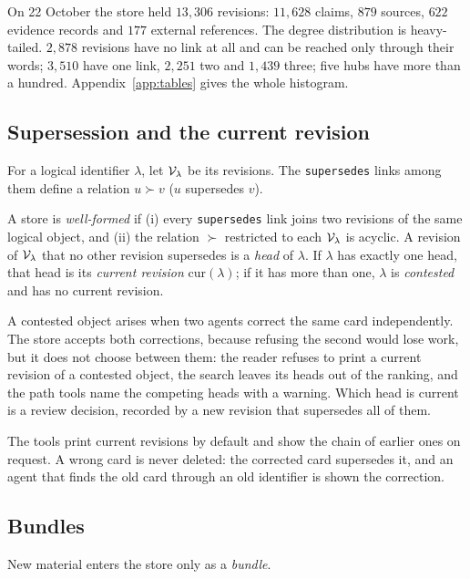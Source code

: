 On 22 October the store held $13{,}306$ revisions: $11{,}628$ claims, $879$ sources, $622$ evidence records and $177$ external references. The degree distribution is heavy-tailed. $2{,}878$ revisions have no link at all and can be reached only through their words; $3{,}510$ have one link, $2{,}251$ two and $1{,}439$ three; five hubs have more than a hundred. Appendix~\ref{app:tables} gives the whole histogram.

\subsection{Supersession and the current revision}

For a logical identifier $\lambda$, let $\mathcal{V}_\lambda$ be its revisions. The \texttt{supersedes} links among them define a relation $u\succ v$ ($u$ supersedes $v$).

\begin{definition}
A store is \emph{well-formed} if (i) every \texttt{supersedes} link joins two revisions of the same logical object, and (ii) the relation $\succ$ restricted to each $\mathcal{V}_\lambda$ is acyclic. A revision of $\mathcal{V}_\lambda$ that no other revision supersedes is a \emph{head} of $\lambda$. If $\lambda$ has exactly one head, that head is its \emph{current revision} $\mathrm{cur}(\lambda)$; if it has more than one, $\lambda$ is \emph{contested} and has no current revision.
\end{definition}

A contested object arises when two agents correct the same card independently. The store accepts both corrections, because refusing the second would lose work, but it does not choose between them: the reader refuses to print a current revision of a contested object, the search leaves its heads out of the ranking, and the path tools name the competing heads with a warning. Which head is current is a review decision, recorded by a new revision that supersedes all of them.

The tools print current revisions by default and show the chain of earlier ones on request. A wrong card is never deleted: the corrected card supersedes it, and an agent that finds the old card through an old identifier is shown the correction.

\subsection{Bundles}

New material enters the store only as a \emph{bundle}.

